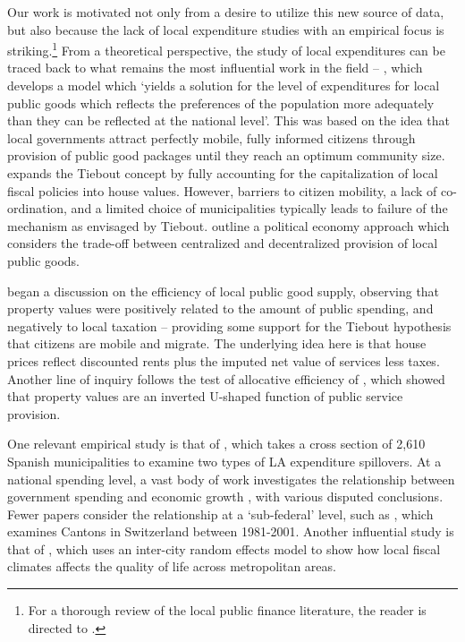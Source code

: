 \documentclass[11pt]{article}
\begin{document}
Our work is motivated not only from a desire to utilize this new source of data, but also because the lack of local expenditure studies with an empirical focus is striking.\footnote{For a thorough review of the local public finance literature, the reader is directed to \cite{Blankart2005}.} From a theoretical perspective, the study of local expenditures can be traced back to what remains the most influential work in the field -- \cite{tiebout1956}, which develops a model which `yields a solution for the level of expenditures for local public goods which reflects the preferences of the population more adequately than they can be reflected at the national level'. This was based on the idea that local governments attract perfectly mobile, fully informed citizens through provision of public good packages until they reach an optimum community size. \cite{yinger1982} expands the Tiebout concept by fully accounting for the capitalization of local fiscal policies into house values. However, barriers to citizen mobility, a lack of co-ordination, and a limited choice of municipalities typically leads to failure of the mechanism as envisaged by Tiebout. \cite{Besley20032611} outline a political economy approach which considers the trade-off between centralized and decentralized provision of local public goods. 

\cite{Oats1969} began a discussion on the efficiency of local public good supply, observing that property values were positively related to the amount of public spending, and negatively to local taxation -- providing some support for the Tiebout hypothesis that citizens are mobile and migrate. The underlying idea here is that house prices reflect discounted rents plus the imputed net value of services less taxes. Another line of inquiry follows the test of allocative efficiency of \cite{Brueckner1982}, which showed that property values are an inverted U-shaped function of public service provision.

One relevant empirical study is that of \cite{SoleOlle2006}, which takes a cross section of 2,610 Spanish municipalities to examine two types of LA expenditure spillovers. At a national spending level, a vast body of work investigates the relationship between government spending and economic growth \citep[such as][]{Barro1991}, with various disputed conclusions. Fewer papers consider the relationship at a `sub-federal' level, such as \cite{Schaltegger2004}, which examines Cantons in Switzerland between 1981-2001. Another influential study is that of \cite{Gyourko1991}, which uses an inter-city random effects model to show how local fiscal climates affects the quality of life across metropolitan areas.
\end{document}
